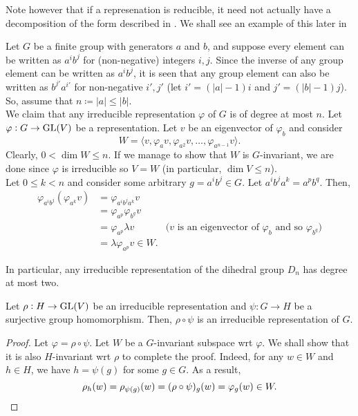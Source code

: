 			Note however that if a represenation is reducible, it need not actually have a decomposition of the form described in . We shall see an example of this later in %

			\begin{fex}
				Let $G$ be a finite group with generators $a$ and $b$, and suppose every element can be written as $a^i b^j$ for (non-negative) integers $i,j$. Since the inverse of any group element can be written as $a^i b^j$, it is seen that any group element can also be written as $b^{j'} a^{i'}$ for non-negative $i',j'$ (let $i' = (|a|-1)i$ and $j' = (|b|-1)j$). So, assume that $n \coloneqq |a| \le |b|$.\\
				We claim that any irreducible representation $\varphi$ of $G$ is of degree at most $n$. Let $\varphi : G \to \operatorname{GL}(V)$ be a representation. Let $v$ be an eigenvector of $\varphi_b$ and consider
				\[ W = \langle v, \varphi_a v, \varphi_{a^2} v, \ldots, \varphi_{a^{n-1}} v \rangle. \]
				Clearly, $0 < \dim W \le n$. If we manage to show that $W$ is $G$-invariant, we are done since $\varphi$ is irreducible so $V = W$ (in particular, $\dim V \le n$). \\
				Let $0 \le k < n$ and consider some arbitrary $g = a^i b^j \in G$. Let $a^i b^j a^k = a^p b^q$. Then,
				\begin{align*}
					\varphi_{a^i b^j} ( \varphi_{a^k} v) &= \varphi_{a^i b^j a^k} v \\
						&= \varphi_{a^p} \varphi_{b^q} v \\
						&= \varphi_{a^p} \lambda v & \text{($v$ is an eigenvector of $\varphi_b$ and so $\varphi_{b^q}$)} \\
						&= \lambda \varphi_{a^p} v \in W.
				\end{align*}

				In particular, any irreducible representation of the dihedral group $D_n$ has degree at most two.
			\end{fex}

			\begin{fprop}
				Let $\rho : H \to \operatorname{GL}(V)$ be an irreducible representation and $\psi : G \to H$ be a surjective group homomorphism. Then, $\rho \circ \psi$ is an irreducible representation of $G$.
			\end{fprop}
			\begin{proof}
				Let $\varphi = \rho \circ \psi$. Let $W$ be a $G$-invariant subspace wrt $\varphi$. We shall show that it is also $H$-invariant wrt $\rho$ to complete the proof. Indeed, for any $w \in W$ and $h \in H$, we have $h = \psi(g)$ for some $g \in G$. As a result,
				\[ \rho_h(w) = \rho_{\psi(g)}(w) = (\rho \circ \psi)_g(w) = \varphi_g(w) \in W. \qedhere \]
			\end{proof}

